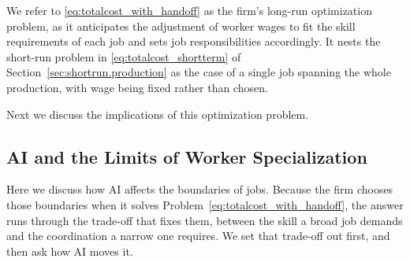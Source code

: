 We refer to \eqref{eq:totalcost_with_handoff} as the firm's long-run optimization problem, as it anticipates the adjustment of worker wages to fit the skill requirements of each job and sets job responsibilities accordingly.
It nests the short-run problem in \eqref{eq:totalcost_shortterm} of Section~\ref{sec:shortrun.production} as the case of a single job spanning the whole production, with wage being fixed rather than chosen.

Next we discuss the implications of this optimization problem.


\subsection{AI and the Limits of Worker Specialization}
\label{sec:longrun.specialization}

Here we discuss how AI affects the boundaries of jobs.
Because the firm chooses those boundaries when it solves Problem~\eqref{eq:totalcost_with_handoff}, the answer runs through the trade-off that fixes them, between the skill a broad job demands and the coordination a narrow one requires.
We set that trade-off out first, and then ask how AI moves it.

